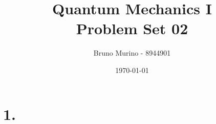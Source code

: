 \documentclass{_mypackages/monograph}
\title{Quantum Mechanics I \\ Problem Set 02} %
\author{Bruno Murino - 8944901} %
\date{\today} %
\begin{document}

\solutionstp

\chapter*{1.}

\end{document}
